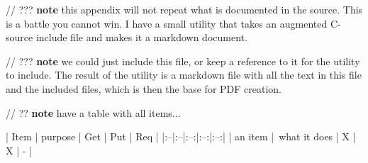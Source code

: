 
// ??? \textbf{note} this appendix will not repeat what is documented in the source. This is a battle you cannot win. I have a small utility that takes an augmented C-source include file and makes it a markdown document. 

// ??? \textbf{note} we could just include this file, or keep a reference to it for the utility to include. The result of the utility is a markdown file with all the text in this file and the included files, which is then the base for PDF creation.

// ?? \textbf{note} have a table with all items... 

| Item | purpose | Get | Put | Req |
|:--|:--|:--:|:--:|:--:|
| an item | what it does | X | X | - |
